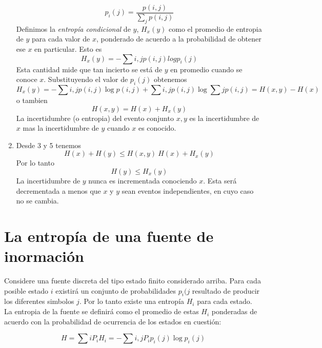 \begin{enumerate}
\begin{equation}
p_{i}(j) = \frac{p(i,j)}{\sum_{j}p(i,j)}
\end{equation}
Definimos la \textit{entrop\'{i}a condicional} de $y$, $H_{x}(y)$ como el promedio de entropia de $y$ para cada valor de $x$, ponderado de acuerdo a la probabilidad de obtener ese $x$ en particular. Esto es
\begin{equation}
H_{x}(y) = -\sum{i,j}{}p(i,j)logp_{i}(j)
\end{equation}
Esta cantidad mide que tan incierto se est\'{a} de $y$ en promedio cuando se conoce $x$. Substituyendo el valor de $p_{i}(j)$ obtenemos
\begin{equation}
H_{x}(y) = -\sum{i,j}{}p(i,j) \log p(i,j) + \sum{i,j}{}p(i,j)\log\sum{j}{}p(i,j) = H(x,y) - H(x)
\end{equation}
o tambien
\begin{equation}
H(x,y) = H(x) + H_{x}(y)
\end{equation}
La incertidumbre (o entropia) del evento conjunto $x,y$ es la incertidumbre de $x$ mas la incertidumbre de $y$ cuando $x$ es conocido.
\item Desde 3 y 5 tenemos
\begin{equation}
H(x) + H(y) \leq H(x,y) \ H(x) + H_{x}(y)
\end{equation}
Por lo tanto
\begin{equation}
H(y) \leq H_{x}(y)
\end{equation}
La incertidumbre de $y$ nunca es incrementada conociendo $x$. Esta
ser\'{a} decrementada a menos que $x$ y $y$ sean eventos
independientes, en cuyo caso no se cambia.
\end{enumerate}

\clearpage

\section{La entrop\'{i}a de una fuente de inormaci\'{o}n}

Considere una fuente discreta del tipo estado finito
considerado arriba. Para cada posible estado $i$ existir\'{a} un
conjunto de probabilidades $p_{i}(j$ resultado de producir
los diferentes simbolos $j$. Por lo tanto existe una entrop\'{i}a $H_{i}$
para cada estado. La entropia de la fuente se definir\'{a} como
el promedio de estas $H_{i}$ ponderadas de acuerdo con la probabilidad
de ocurrencia de los estados en cuesti\'{o}n:

\begin{equation}
H = \sum{i}{} P_{i}H_{i}
  = - \sum{i,j}{} P_{i}p_{i}(j) \log p_{i}(j)
\end{equation}

